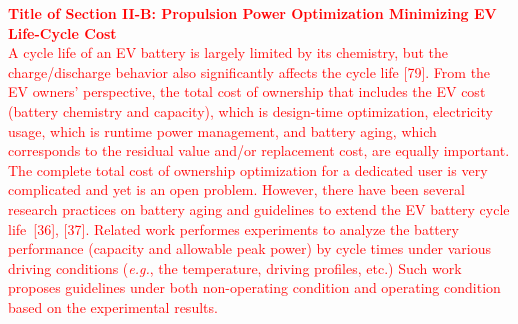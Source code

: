\documentclass[onecolumn]{IEEEconf}
\begin{document}
\begin{description}
\textcolor{red}{
\textbf{Title of Section II-B: Propulsion Power Optimization Minimizing EV Life-Cycle Cost}\\
A cycle life of an EV battery is largely limited by its chemistry, but the charge/discharge behavior also significantly affects the cycle life [79]. From the EV owners' perspective, the total cost of ownership that includes the EV cost (battery chemistry and capacity), which is design-time optimization, electricity usage, which is runtime power management, and battery aging, which corresponds to the residual value and/or replacement cost, are equally important. The complete total cost of ownership optimization for a dedicated user is very complicated  and yet is an open problem. 
%
However, there have been several research practices on battery aging and guidelines to extend the EV battery cycle life~[36], [37]. Related work performes experiments to analyze the battery performance (capacity and allowable peak power) by cycle times under various driving conditions (\textit{e.g.}, the temperature, driving profiles, etc.) Such work proposes guidelines under both non-operating condition and operating condition based on the experimental results.}
~\\

\end{description}

\pagebreak
\end{document}
